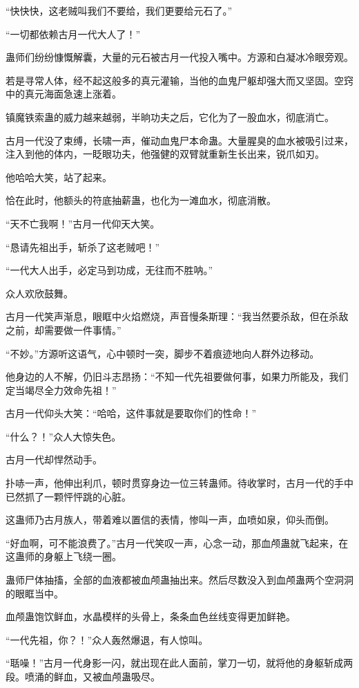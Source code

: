 \begin{this_body}
“快快快，这老贼叫我们不要给，我们更要给元石了。”

“一切都依赖古月一代大人了！”

蛊师们纷纷慷慨解囊，大量的元石被古月一代投入嘴中。方源和白凝冰冷眼旁观。

若是寻常人体，经不起这般多的真元灌输，当他的血鬼尸躯却强大而又坚固。空窍中的真元海面急速上涨着。

镇魔铁索蛊的威力越来越弱，半晌功夫之后，它化为了一股血水，彻底消亡。

古月一代没了束缚，长啸一声，催动血鬼尸本命蛊。大量腥臭的血水被吸引过来，注入到他的体内，一眨眼功夫，他强健的双臂就重新生长出来，锐爪如刃。

他哈哈大笑，站了起来。

恰在此时，他额头的符底抽薪蛊，也化为一滩血水，彻底消散。

“天不亡我啊！”古月一代仰天大笑。

“恳请先祖出手，斩杀了这老贼吧！”

“一代大人出手，必定马到功成，无往而不胜呐。”

众人欢欣鼓舞。

古月一代笑声渐息，眼眶中火焰燃烧，声音慢条斯理：“我当然要杀敌，但在杀敌之前，却需要做一件事情。”

“不妙。”方源听这语气，心中顿时一突，脚步不着痕迹地向人群外边移动。

他身边的人不解，仍旧斗志昂扬：“不知一代先祖要做何事，如果力所能及，我们定当竭尽全力效命先祖！”

古月一代仰头大笑：“哈哈，这件事就是要取你们的性命！”

“什么？！”众人大惊失色。

古月一代却悍然动手。

扑哧一声，他伸出利爪，顿时贯穿身边一位三转蛊师。待收掌时，古月一代的手中已然抓了一颗怦怦跳的心脏。

这蛊师乃古月族人，带着难以置信的表情，惨叫一声，血喷如泉，仰头而倒。

“好血啊，可不能浪费了。”古月一代笑叹一声，心念一动，那血颅蛊就飞起来，在这蛊师的身躯上飞绕一圈。

蛊师尸体抽搐，全部的血液都被血颅蛊抽出来。然后尽数没入到血颅蛊两个空洞洞的眼眶当中。

血颅蛊饱饮鲜血，水晶模样的头骨上，条条血色丝线变得更加鲜艳。

“一代先祖，你？！”众人轰然爆退，有人惊叫。

“聒噪！”古月一代身影一闪，就出现在此人面前，掌刀一切，就将他的身躯斩成两段。喷涌的鲜血，又被血颅蛊吸尽。


\end{this_body}
